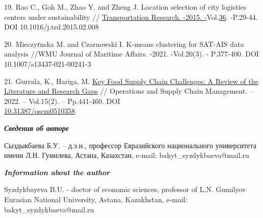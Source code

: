 \begin{references}
19. Rao C., Goh M., Zhao Y. and Zheng J. Location selection of city
logistics centers under sustainability //
\href{https://www.sciencedirect.com/journal/transportation-research-part-d-transport-and-environment}{Transportation
Research. -2015.
-}Vol.\href{file:///C:/Users/admin/Desktop/загрузки/36}{36}. -P.29-44.
DOI 10.1016/j.trd.2015.02.008

20. Mieczyґnska M. and Czarnowski I. K-means clustering for SAT-AIS data
analysis //WMU Journal of Maritime Affairs. -2021. -Vol.20(3). -
P.377-400. DOI 10.1007/s13437-021-00241-3

21. Gurrala, K., Hariga, M.
\href{https://journal.oscm-forum.org/publication/article/key-food-supply-chain-challenges-a-review-of-the-literature-and-research-gaps}{Key
Food Supply Chain Challenges: A Review of the Literature and Research
Gaps} // Operations and Supply Chain Management. -- 2022. -- Vol.15(2).
-- Pp.441-460. DOI\\
\href{http://doi.org/10.31387/oscm0510358}{10.31387/oscm0510358}
\end{references}

\begin{authorinfo}
\emph{{\bfseries Сведения об авторе}}

Сыздыкбаева Б.У. -- д.э.н., профессор Евразийского национального
университета имени Л.Н. Гумилева, Астана, Казахстан, e-mail:
bakyt\_syzdykbaeva@mail.ru

\emph{{\bfseries Information about the author}}

Syzdykbayeva B.U. - doctor of economic sciences, professor of
L.N. Gumilyov Eurasian National University, Astana, Kazakhstan, e-mail:
bakyt\_syzdykbaeva@mail.ru
\end{authorinfo}

